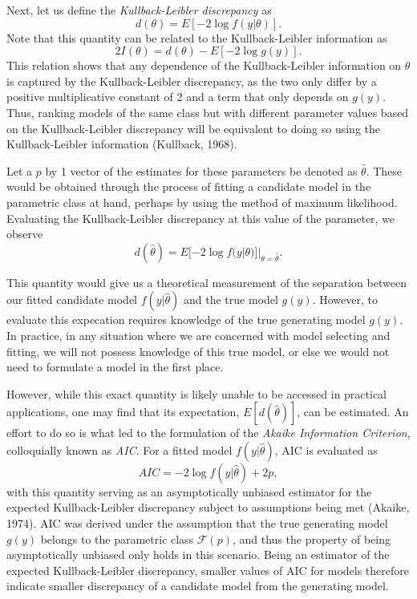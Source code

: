 		Next, let us define the \textit{Kullback-Leibler discrepancy} as
		\begin{equation}
			d(\theta) = E[-2 \log f(y|\theta)] .
		\end{equation}
		Note that this quantity can be related to the Kullback-Leibler information as
		\begin{equation}
			2 I(\theta) = d(\theta) - E \left[ -2 \log g(y) \right].
		\end{equation}
		This relation shows that any dependence of the Kullback-Leibler information on $\theta$ is captured by the Kullback-Leibler discrepancy, as the two only differ by a positive
		multiplicative constant of 2 and a term that only depends on $g(y)$. Thus, ranking models of the same class but with different parameter values based on the Kullback-Leibler
		discrepancy will be equivalent to doing so using the Kullback-Leibler information (Kullback, 1968).
		
		Let a $p$ by 1 vector of the estimates for these parameters be denoted as $\hat{\theta}$. These would be obtained through the process of fitting a candidate model in the
		parametric class at hand, perhaps by using the method of maximum likelihood. Evaluating the Kullback-Leibler discrepancy at this value of the parameter, we observe
		\begin{equation}
			d(\hat{\theta}) = E [ -2 \log f(y | \theta)]|_{\theta = \hat{\theta}}.
		\end{equation}

		This quantity would give us a theoretical measurement of the separation between our fitted candidate model $f(y|\hat{\theta})$ and the true model $g(y)$. However, to
		evaluate this expecation requires knowledge of the true generating model $g(y)$. In practice, in any situation where we are concerned with model selecting and fitting,
		we will not possess knowledge of this true model, or else we would not need to formulate a model in the first place.

		However, while this exact quantity is likely unable to be accessed in practical applications, one may find that its expectation, $E[d(\hat{\theta})]$, can be estimated. An
		effort to do so is what led to the formulation of the \textit{Akaike Information Criterion}, colloquially known as \textit{AIC}. For a fitted model $f(y|\hat{\theta})$,
		AIC is evaluated as
		\begin{equation}
			AIC = -2 \log f(y|\hat{\theta}) + 2 p,
		\end{equation}
		with this quantity serving as an asymptotically unbiased estimator for the expected Kullback-Leibler discrepancy subject to assumptions being met (Akaike, 1974). AIC was derived
		under the assumption that the true generating model $g(y)$ belongs to the parametric class $\mathcal{F}(p)$, and thus the property of being asymptotically unbiased only
		holds in this scenario. Being an estimator of the expected Kullback-Leibler discrepancy, smaller values of AIC for models therefore indicate smaller discrepancy of a candidate
		model from the generating model.  

